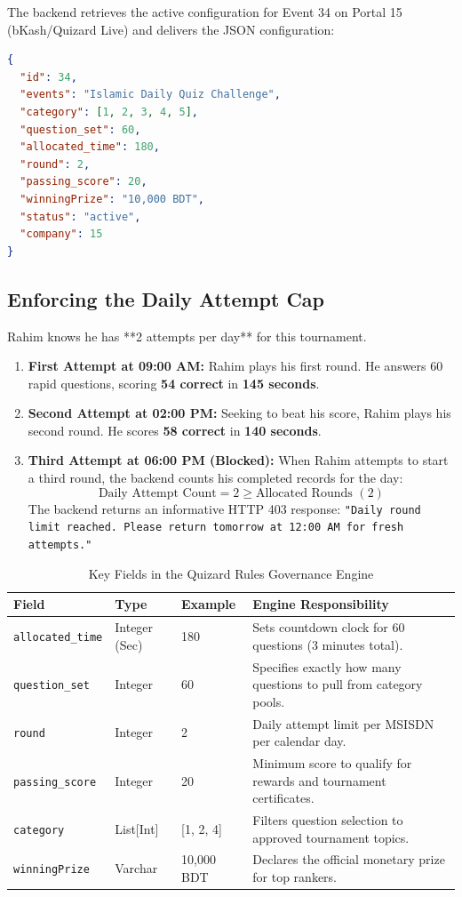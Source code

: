 The backend retrieves the active configuration for Event 34 on Portal 15 (bKash/Quizard Live) and delivers the JSON configuration:

\begin{lstlisting}[language=json, caption={Rules Engine JSON Payload for 60-Question Tournament}]
{
  "id": 34,
  "events": "Islamic Daily Quiz Challenge",
  "category": [1, 2, 3, 4, 5],
  "question_set": 60,
  "allocated_time": 180,
  "round": 2,
  "passing_score": 20,
  "winningPrize": "10,000 BDT",
  "status": "active",
  "company": 15
}
\end{lstlisting}

\subsection{Enforcing the Daily Attempt Cap}
Rahim knows he has **2 attempts per day** for this tournament. 

\begin{enumerate}
    \item \textbf{First Attempt at 09:00 AM:} Rahim plays his first round. He answers 60 rapid questions, scoring \textbf{54 correct} in \textbf{145 seconds}.
    \item \textbf{Second Attempt at 02:00 PM:} Seeking to beat his score, Rahim plays his second round. He scores \textbf{58 correct} in \textbf{140 seconds}.
    \item \textbf{Third Attempt at 06:00 PM (Blocked):} When Rahim attempts to start a third round, the backend counts his completed records for the day:
    $$\text{Daily Attempt Count} = 2 \ge \text{Allocated Rounds } (2)$$
    The backend returns an informative HTTP 403 response: \texttt{"Daily round limit reached. Please return tomorrow at 12:00 AM for fresh attempts."}
\end{enumerate}

\begin{table}[htbp]
\centering
\small
\begin{tabular}{|l|l|l|p{6.5cm}|}
\hline
\rowcolor{primaryBlue!15}
\textbf{Field} & \textbf{Type} & \textbf{Example} & \textbf{Engine Responsibility} \\ \hline
\texttt{allocated\_time} & Integer (Sec) & 180 & Sets countdown clock for 60 questions (3 minutes total). \\ \hline
\texttt{question\_set} & Integer & 60 & Specifies exactly how many questions to pull from category pools. \\ \hline
\texttt{round} & Integer & 2 & Daily attempt limit per MSISDN per calendar day. \\ \hline
\texttt{passing\_score} & Integer & 20 & Minimum score to qualify for rewards and tournament certificates. \\ \hline
\texttt{category} & List[Int] & [1, 2, 4] & Filters question selection to approved tournament topics. \\ \hline
\texttt{winningPrize} & Varchar & 10,000 BDT & Declares the official monetary prize for top rankers. \\ \hline
\end{tabular}
\caption{Key Fields in the Quizard Rules Governance Engine}
\end{table}

